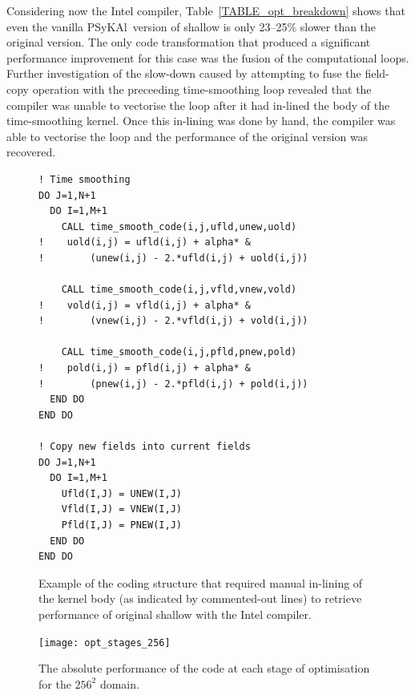 \documentclass[journal]{IEEEtran}
\newcommand{\psykal}{{PS}y{KA}l\ }
\begin{document}
Considering now the Intel compiler, Table~\ref{TABLE_opt_breakdown}
shows that even the vanilla \psykal version of shallow is only
23--25\% slower than the original version. The only code
transformation that produced a significant performance improvement for
this case was the fusion of the computational loops. Further
investigation of the slow-down caused by attempting to fuse the
field-copy operation with the preceeding time-smoothing loop revealed
that the compiler was unable to vectorise the loop after it had
in-lined the body of the time-smoothing kernel. Once this in-lining
was done by hand, the compiler was able to vectorise the loop and the
performance of the original version was recovered.

\begin{figure}
\begin{verbatim}
! Time smoothing
DO J=1,N+1
  DO I=1,M+1
    CALL time_smooth_code(i,j,ufld,unew,uold)
!    uold(i,j) = ufld(i,j) + alpha* &
!        (unew(i,j) - 2.*ufld(i,j) + uold(i,j))

    CALL time_smooth_code(i,j,vfld,vnew,vold)
!    vold(i,j) = vfld(i,j) + alpha* &
!        (vnew(i,j) - 2.*vfld(i,j) + vold(i,j))

    CALL time_smooth_code(i,j,pfld,pnew,pold)
!    pold(i,j) = pfld(i,j) + alpha* &
!        (pnew(i,j) - 2.*pfld(i,j) + pold(i,j))
  END DO
END DO

! Copy new fields into current fields
DO J=1,N+1
  DO I=1,M+1
    Ufld(I,J) = UNEW(I,J)
    Vfld(I,J) = VNEW(I,J)
    Pfld(I,J) = PNEW(I,J)
  END DO
END DO
\end{verbatim}
\caption{Example of the coding structure that required manual
  in-lining of the kernel body (as indicated by commented-out lines)
  to retrieve performance of original shallow with the Intel
  compiler.}
\label{FIG_time_smooth_code}
\end{figure}


\begin{figure}[!t]
\centering
\texttt{[image: opt\_stages\_256]}
\caption{The absolute performance of the code at each stage of 
optimisation for the $256^{2}$ domain.}
\label{FIG_opt_stages_256}
\end{figure}
\end{document}
